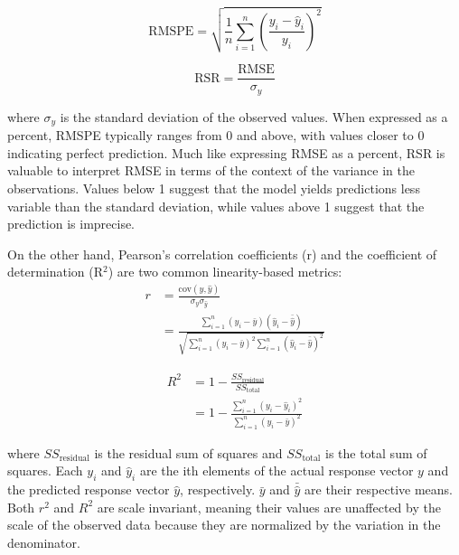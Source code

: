 \begin{equation} \label{eq_rmspe}
    \text{RMSPE} = \sqrt{\frac{1}{n} \sum_{i=1}^{n} (\frac{y_i - \hat{y}_i}{y_i})^2}
\end{equation}

\begin{equation} \label{eq_rsr}
    \text{RSR} = \frac{\text{RMSE}}{\sigma_y}
\end{equation}

where $\sigma_y$ is the standard deviation of the observed values. When expressed as a percent, RMSPE typically ranges from 0 and above, with values closer to 0 indicating perfect prediction. Much like expressing RMSE as a percent, RSR is valuable to interpret RMSE in terms of the context of the variance in the observations. Values below 1 suggest that the model yields predictions less variable than the standard deviation, while values above 1 suggest that the prediction is imprecise.

On the other hand, Pearson's correlation coefficients (r) and the coefficient of determination (R$^2$) are two common linearity-based metrics:
\begin{equation} \label{eq_r}
    \begin{aligned}
    r &= \frac{\text{cov}(y, \hat{y})}{\sigma_y \sigma_{\hat{y}}} \\
    &= \frac{\sum_{i=1}^{n} (y_i - \bar{y})(\hat{y}_i - \bar{\hat{y}})}{\sqrt{\sum_{i=1}^{n} (y_i - \bar{y})^2 \sum_{i=1}^{n} (\hat{y}_i - \bar{\hat{y}})^2}}
    \end{aligned}
\end{equation}

\begin{equation} \label{eq_R2}
    \begin{aligned}
    R^2 &= 1 - \frac{SS_{\text{residual}}}{SS_{\text{total}}} \\
    &= 1 - \frac{\sum_{i=1}^{n} (y_i - \hat{y}_i)^2}{\sum_{i=1}^{n} (y_i - \bar{y})^2}
    \end{aligned}
\end{equation}

where \(SS_{\text{residual}}\) is the residual sum of squares and \(SS_{\text{total}}\) is the total sum of squares. Each \(y_i\) and \(\hat{y}_i\) are the ith elements of the actual response vector \(y\) and the predicted response vector \(\hat{y}\), respectively. \(\bar{y}\) and \(\bar{\hat{y}}\) are their respective means. Both \(r^2\) and \(R^2\) are scale invariant, meaning their values are unaffected by the scale of the observed data because they are normalized by the variation in the denominator.

